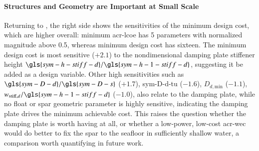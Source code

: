 \paragraph{Structures and Geometry are Important at Small Scale}
\ifdefined\DISSERTATION
    Returning to , the right side shows the sensitivities of the minimum design cost, which are higher overall:
    minimum \gls{acr-lcoe} has 5 parameters with normalized magnitude above 0.5, whereas minimum design cost has sixteen.
    The minimum design cost is most sensitive ($+2.1$) to the nondimensional damping plate stiffener height $\gls{sym-h-stiff-d}/\gls{sym-h-1-stiff-d}$,
    suggesting it be added as a design variable.
    Other high sensitivities such as
    $\gls{sym-D-d}/\gls{sym-D-s}$ ($+1.7$),
    \gls{sym-D-d-tu} ($-1.6$),
    $D_{d,\text{min}}$ ($-1.1$),
    $w_{\text{stiff},d}/\gls{sym-h-1-stiff-d}$ ($-1.0$),
    also relate to the damping plate, while no float or spar geometric parameter is highly sensitive,
    indicating the damping plate drives the minimum achievable cost.
    This raises the question whether the damping plate is worth having at all,
    or whether a low-power, low-cost \gls{acr-wec} would do better to fix the spar to the seafloor in sufficiently shallow water,
    a comparison worth quantifying in future work.
    
